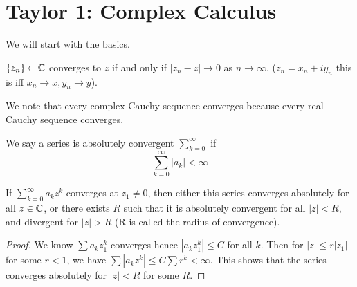 \chapter{Taylor 1: Complex Calculus}
We will start with the basics.
\begin{defn}[convergence]
    $\{z_n\}\subset\mathbb{C}$ converges to $z$ if and only if $|z_n-z|\to 0$ as $n\to\infty$. ($z_n=x_n+iy_n$ this is iff $x_n\to x, y_n\to y$).
\end{defn}
We note that every complex Cauchy sequence converges because every real Cauchy sequence converges.

\begin{defn}
    We say a series is absolutely convergent $\sum_{k=0}^\infty$ if 
    \begin{equation*}
        \sum_{k=0}^\infty |a_k|<\infty
    \end{equation*}
\end{defn}
\begin{prop}
    If $\sum_{k=0}^{\infty} a_kz^k$ converges at $z_1\neq 0$, then either this series converges absolutely for all $z\in\mathbb{C}$, or there exists $R$ such that it is absolutely convergent for all $|z|<R$, and divergent for $|z|>R$ (R is called the radius of convergence).
\end{prop}
\begin{proof}
    We know $\sum a_kz_1^k$ converges hence $|a_kz_1^k|\leq C$ for all $k$. Then for $|z|\leq r|z_1|$ for some $r<1$, we have $\sum|a_kz^k|\leq C\sum r^k<\infty$. This shows that the series converges absolutely for $|z|<R$ for some $R$.
\end{proof}

